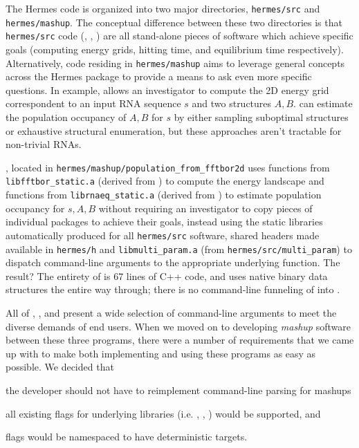 \documentclass[11pt]{article}
\begin{document}
The Hermes code is organized into two major directories, {\tt hermes/src} and {\tt hermes/mashup}. The conceptual difference between these two directories is that {\tt hermes/src} code (\fft, \rnamfpt, \rnaeq) are all stand-alone pieces of software which achieve specific goals (computing energy grids, hitting time, and equilibrium time respectively). Alternatively, code residing in {\tt hermes/mashup} aims to leverage general concepts across the Hermes package to provide a means to ask even more specific questions. In example, \fft allows an investigator to compute the 2D energy grid correspondent to an input RNA sequence $s$ and two structures $A, B$. \rnaeq can estimate the population occupancy of $A, B$ for $s$ by either sampling suboptimal structures or exhaustive structural enumeration, but these approaches aren't tractable for non-trivial RNAs.

\ffteq, located in {\tt hermes/mashup/population\_from\_fftbor2d} uses functions from \\ {\tt libfftbor\_static.a} (derived from \fft) to compute the energy landscape and functions from {\tt librnaeq\_static.a} (derived from \rnaeq) to estimate population occupancy for $s, A, B$ without requiring an investigator to copy pieces of individual packages to achieve their goals, instead using the static libraries automatically produced for all {\tt hermes/src} software, shared headers made available in {\tt hermes/h} and {\tt libmulti\_param.a} (from {\tt hermes/src/multi\_param}) to dispatch command-line arguments to the appropriate underlying function. The result? The entirety of \ffteq is 67 lines of C++ code, and uses native binary data structures the entire way through; there is no command-line funneling of \fft into \rnaeq.


All of \fft, \rnamfpt, and \rnaeq present a wide selection of command-line arguments to meet the diverse demands of end users. When we moved on to developing {\em mashup} software between these three programs, there were a number of requirements that we came up with to make both implementing and using these programs as easy as possible. We decided that
\begin{inparaenum}
\item the developer should not have to reimplement command-line parsing for mashups
\item all existing flags for underlying libraries (i.e. \fft, \rnamfpt, \rnaeq) would be supported, and
\item flags would be namespaced to have deterministic targets.
\end{inparaenum}
\end{document}
